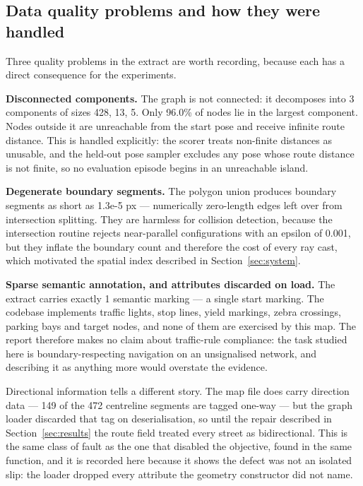 \documentclass[conference]{IEEEtran}
\begin{document}
\subsection{Data quality problems and how they were handled}

Three quality problems in the extract are worth recording, because each has a direct consequence for the experiments.

\textbf{Disconnected components.} The graph is not connected: it decomposes into 3 components of sizes 428, 13, 5. Only 96.0\% of nodes lie in the largest component. Nodes outside it are unreachable from the start pose and receive infinite route distance. This is handled explicitly: the scorer treats non-finite distances as unusable, and the held-out pose sampler excludes any pose whose route distance is not finite, so no evaluation episode begins in an unreachable island.

\textbf{Degenerate boundary segments.} The polygon union produces boundary segments as short as 1.3e-5 px — numerically zero-length edges left over from intersection splitting. They are harmless for collision detection, because the intersection routine rejects near-parallel configurations with an epsilon of 0.001, but they inflate the boundary count and therefore the cost of every ray cast, which motivated the spatial index described in Section~\ref{sec:system}.

\textbf{Sparse semantic annotation, and attributes discarded on load.} The extract carries exactly 1 semantic marking — a single start marking. The codebase implements traffic lights, stop lines, yield markings, zebra crossings, parking bays and target nodes, and none of them are exercised by this map. The report therefore makes no claim about traffic-rule compliance: the task studied here is boundary-respecting navigation on an unsignalised network, and describing it as anything more would overstate the evidence.

Directional information tells a different story. The map file does carry direction data — 149 of the 472 centreline segments are tagged one-way — but the graph loader discarded that tag on deserialisation, so until the repair described in Section~\ref{sec:results} the route field treated every street as bidirectional. This is the same class of fault as the one that disabled the objective, found in the same function, and it is recorded here because it shows the defect was not an isolated slip: the loader dropped every attribute the geometry constructor did not name.
\end{document}
